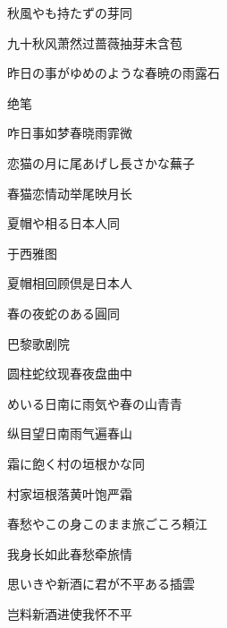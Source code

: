\begin{haiku}
    {\FH 秋風やも持たずの芽}\hfill{\FH 同}

    {\FK 九十秋风萧然过蔷薇抽芽未含苞}
\end{haiku}

\begin{haiku}
    {\FH 昨日の事がゆめのような春暁の雨}\hfill{\FH 露石}

    {\FK 绝笔}

    {\FK 咋日事如梦春晓雨霏微}
\end{haiku}

\begin{haiku}
    {\FH 恋猫の月に尾あげし長さかな}\hfill{\FH 蕪子}

    {\FK 春猫恋情动举尾映月长}
\end{haiku}

\begin{haiku}
    {\FH 夏帽や相る日本人}\hfill{\FH 同}

    {\FK 于西雅图}

    {\FK 夏帽相回顾倶是日本人}
\end{haiku}

\begin{haiku}
    {\FH 春の夜蛇のある圓}\hfill{\FH 同}

    {\FK 巴黎歌剧院}

    {\FK 圆柱蛇纹现春夜盘曲中}
\end{haiku}

\begin{haiku}
    {\FH {}めいる日南に雨気や春の山}\hfill{\FH 青青}

    {\FK 纵目望日南雨气遍春山}
\end{haiku}

\begin{haiku}
    {\FH 霜に飽く村の垣根かな}\hfill{\FH 同}

    {\FK 村家垣根落黄叶饱严霜}
\end{haiku}

\begin{haiku}
    {\FH 春愁やこの身このまま旅ごころ}\hfill{\FH 頼江}

    {\FK 我身长如此春愁牵旅情}
\end{haiku}

\begin{haiku}
    {\FH 思いきや新酒に君が不平ある}\hfill{\FH 插雲}

    {\FK 岂料新酒进使我怀不平}
\end{haiku}

